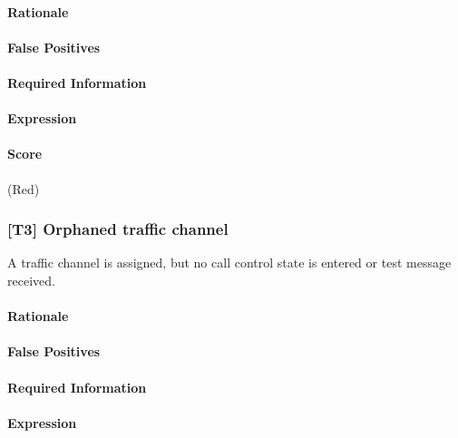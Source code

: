 \documentclass[a4paper,11pt,notitlepage,bigheadings,oneside]{scrartcl}
\begin{document}
\paragraph{Rationale}

\TBD{}

\paragraph{False Positives}

\TBD{}

\paragraph{Required Information}

\TBD{}

\paragraph{Expression}

\TBD{}

\paragraph{Score}

\TBD{} (Red)

\subsubsection{[T3] Orphaned traffic channel}

A traffic channel is assigned, but no call control state is entered or test
message received.

\paragraph{Rationale}

\TBD{}

\paragraph{False Positives}

\TBD{}

\paragraph{Required Information}

\TBD{}

\paragraph{Expression}
\end{document}
